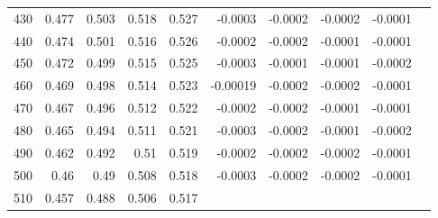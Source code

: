 \documentclass[11pt]{article}
\begin{document}
\begin{table}[!htp]
\begin{tabular}{l|r|r|r|r|r|r|r|r|r}
    430 &0.477 &0.503 &0.518 &0.527 &-0.0003 &-0.0002 &-0.0002 &-0.0001 \\
    440 &0.474 &0.501 &0.516 &0.526 &-0.0002 &-0.0002 &-0.0001 &-0.0001 \\
    450 &0.472 &0.499 &0.515 &0.525 &-0.0003 &-0.0001 &-0.0001 &-0.0002 \\
    460 &0.469 &0.498 &0.514 &0.523 &-0.00019 &-0.0002 &-0.0002 &-0.0001 \\
    470 &0.467 &0.496 &0.512 &0.522 &-0.0002 &-0.0002 &-0.0001 &-0.0001 \\
    480 &0.465 &0.494 &0.511 &0.521 &-0.0003 &-0.0002 &-0.0001 &-0.0002 \\
    490 &0.462 &0.492 &0.51 &0.519 &-0.0002 &-0.0002 &-0.0002 &-0.0001 \\
    500 &0.46 &0.49 &0.508 &0.518 &-0.0003 &-0.0002 &-0.0002 &-0.0001 \\
    510 &0.457 &0.488 &0.506 &0.517 & & & & \\

    \end{tabular}
    \end{table}
\end{document}
